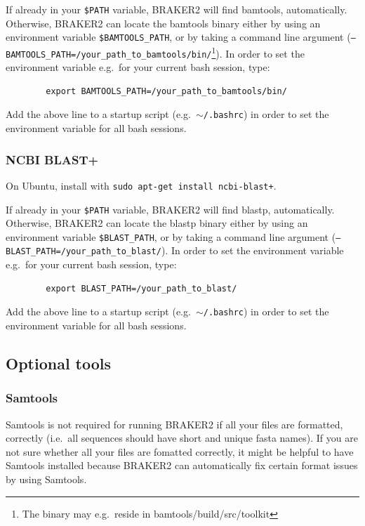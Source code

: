 \documentclass[a4paper,10pt]{report}
\begin{document}
 If already in your \texttt{\$PATH} variable, BRAKER2 will find bamtools, automatically. Otherwise, BRAKER2 can locate the bamtools binary either by using an environment variable \texttt{\$BAMTOOLS\_PATH}, or by taking a command line argument (\texttt{--BAMTOOLS\_PATH=/your\_path\_to\_bamtools/bin/}\footnote{The binary may e.g.~reside in bamtools/build/src/toolkit}). In order to set the environment variable e.g.~for your current bash session, type:

    \begin{verbatim}
        export BAMTOOLS_PATH=/your_path_to_bamtools/bin/ 
    \end{verbatim} 

    Add the above line to a startup script (e.g.~\texttt{$\sim$/.bashrc}) in order to set the environment variable for all bash sessions.

    
\subsubsection{NCBI BLAST+}

On Ubuntu, install with \texttt{sudo apt-get install ncbi-blast+}.

If already in your \texttt{\$PATH} variable, BRAKER2 will find blastp, automatically. Otherwise, BRAKER2 can locate the blastp binary either by using an environment variable \texttt{\$BLAST\_PATH}, or by taking a command line argument (\texttt{--BLAST\_PATH=/your\_path\_to\_blast/}). In order to set the environment variable e.g.~for your current bash session, type:

    \begin{verbatim}
        export BLAST_PATH=/your_path_to_blast/ 
    \end{verbatim} 

    Add the above line to a startup script (e.g.~\texttt{$\sim$/.bashrc}) in order to set the environment variable for all bash sessions.




\subsection{Optional tools}

\subsubsection{Samtools}

Samtools is not required for running BRAKER2 if all your files are formatted, correctly (i.e.~all sequences should have short and unique fasta names). If you are not sure
      whether all your files are fomatted correctly, it might be helpful to have Samtools
      installed because BRAKER2 can automatically fix certain format issues by using Samtools. 
\end{document}
